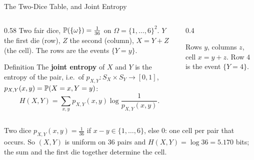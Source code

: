 \begin{frame}{The Two-Dice Table, and Joint Entropy}
  \small
  \begin{columns}[T]
    \begin{column}{0.58\textwidth}
      Two fair dice, $\mathbb{P}(\{\omega\})=\tfrac1{36}$ on $\Omega=\{1,\dots,6\}^2$. $Y$ the first die (row), $Z$ the second (column), $X=Y+Z$ (the cell). The rows are the events $\{Y=y\}$.
      \begin{block}{Definition}
        The \textbf{joint entropy} of $X$ and $Y$ is the entropy of the pair, i.e.\ of $p_{X,Y}\colon S_X\times S_Y\to[0,1]$, $p_{X,Y}(x,y)=\mathbb{P}(X=x,Y=y)$:
        \[
          H(X,Y)=\sum_{x,y}p_{X,Y}(x,y)\log\frac1{p_{X,Y}(x,y)} .
        \]
      \end{block}
    \end{column}
    \begin{column}{0.4\textwidth}
      \centering
      \par
      {\footnotesize Rows $y$, columns $z$, cell $x=y+z$. Row $4$ is the event $\{Y=4\}$.}
    \end{column}
  \end{columns}
  \begin{exampleblock}{Two dice}
    $p_{X,Y}(x,y)=\tfrac1{36}$ if $x-y\in\{1,\dots,6\}$, else $0$: one cell per pair that occurs. So $(X,Y)$ is uniform on $36$ pairs and $H(X,Y)=\log36=5.170$ bits; the sum and the first die together determine the cell.
  \end{exampleblock}
\end{frame}

